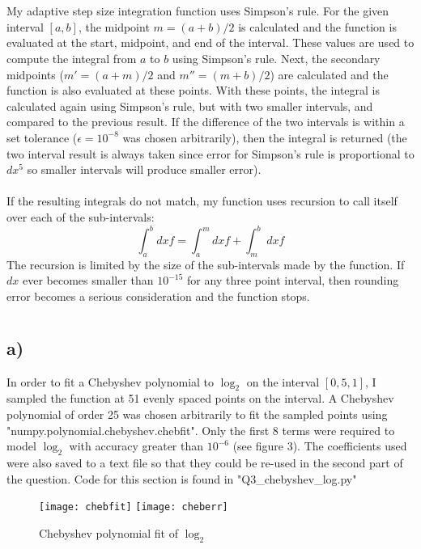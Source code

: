 \documentclass{article}
\newcommand{\<}[1]{\left\langle #1 \right\rangle }
\begin{document}
\section{}
My adaptive step size integration function uses Simpson's rule. For the given interval $[a, b]$, the midpoint $m = (a+b)/2$ is calculated and the function is evaluated at the start, midpoint, and end of the interval. These values are used to compute the integral from $a$ to $b$ using Simpson's rule. Next, the secondary midpoints ($m' = (a+m)/2$ and $m'' = (m+b)/2$) are calculated and the function is also evaluated at these points. With these points, the integral is calculated again using Simpson's rule, but with two smaller intervals, and compared to the previous result. If the difference of the two intervals is within a set tolerance ($\epsilon = 10^{-8}$ was chosen arbitrarily), then the integral is returned (the two interval result is always taken since error for Simpson's rule is proportional to $dx^5$ so smaller intervals will produce smaller error).\\
\\
If the resulting integrals do not match, my function uses recursion to call itself over each of the sub-intervals:
\[\int_a^b dx f = \int_a^m dx f + \int_m^b dx f \]
The recursion is limited by the size of the sub-intervals made by the function. If $dx$ ever becomes smaller than $10^{-15}$ for any three point interval, then rounding error becomes a serious consideration and the function stops.
 
\section{}
\subsection{a)}
In order to fit a Chebyshev polynomial to $\log_2$ on the interval $[0,5, 1]$, I sampled the function at 51 evenly spaced points on the interval. A Chebyshev polynomial of order 25 was chosen arbitrarily to fit the sampled points using "numpy.polynomial.chebyshev.chebfit". Only the first 8 terms were required to model $\log_2$ with accuracy greater than $10^{-6}$ (see figure 3). The coefficients used were also saved to a text file so that they could be re-used in the second part of the question. Code for this section is found in "Q3\_chebyshev\_log.py"
\begin{figure}[h]
	\caption{Chebyshev polynomial fit of $\log_2$}
	\centering
	\texttt{[image: chebfit]}
	\texttt{[image: cheberr]}
\end{figure} 
\end{document}
